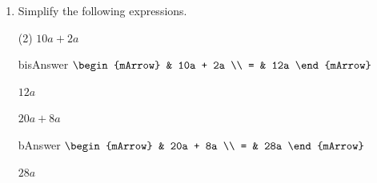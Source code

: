 \begin{enumerate}[resume]	
  \item Simplify the following expressions.
  \begin{subtask}(2)
    \task[]  $ 10a + 2a  $
              \begin{envOut}[height=6cm]{bisAnswer}
			       $\begin{mArrow}
			                & 10a  + 2a       \\ 
                          = & 12a   
	                \end{mArrow}$
              \end{envOut}			  
			  \begin{exercise}\begin{shortsolution}  
				       $12a$
			  \end{shortsolution}\end{exercise}
			  
    \task[]  $ 20a  + 8a  $
              \begin{envOut}[height=6cm]{bAnswer}
			       $\begin{mArrow}
			                & 20a  + 8a       \\ 
                          = & 28a	  
	                \end{mArrow}$
              \end{envOut}			  
			  \begin{exercise}\begin{shortsolution}  
				       $28a$
			  \end{shortsolution}\end{exercise}			  

    \end{subtask}
\end{enumerate}

